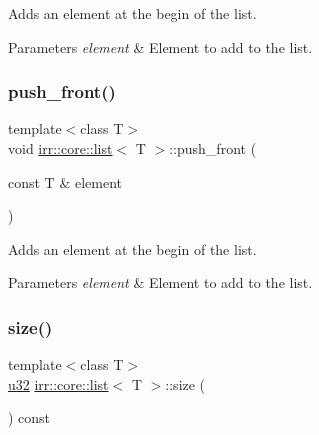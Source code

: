 Adds an element at the begin of the list. 


\begin{DoxyParams}{Parameters}
{\em element} & Element to add to the list. \\
\hline
\end{DoxyParams}
\mbox{\label{classirr_1_1core_1_1list_aec58963596cbc0435e706d1d00777b61}} 
\subsubsection{\texorpdfstring{push\+\_\+front()}{push\_front()}\hspace{0.1cm}{\footnotesize\ttfamily [2/2]}}
{\footnotesize\ttfamily template$<$class T$>$ \\
void \hyperlink{classirr_1_1core_1_1list}{irr\+::core\+::list}$<$ T $>$\+::push\+\_\+front (\begin{DoxyParamCaption}\item[{const T \&}]{element }\end{DoxyParamCaption})\hspace{0.3cm}{\ttfamily [inline]}}



Adds an element at the begin of the list. 


\begin{DoxyParams}{Parameters}
{\em element} & Element to add to the list. \\
\hline
\end{DoxyParams}
\mbox{\label{classirr_1_1core_1_1list_a374ab663f2439599a6b99b47a31e793d}} 
\subsubsection{\texorpdfstring{size()}{size()}\hspace{0.1cm}{\footnotesize\ttfamily [1/2]}}
{\footnotesize\ttfamily template$<$class T$>$ \\
\hyperlink{namespaceirr_a0416a53257075833e7002efd0a18e804}{u32} \hyperlink{classirr_1_1core_1_1list}{irr\+::core\+::list}$<$ T $>$\+::size (\begin{DoxyParamCaption}{ }\end{DoxyParamCaption}) const\hspace{0.3cm}{\ttfamily [inline]}}



